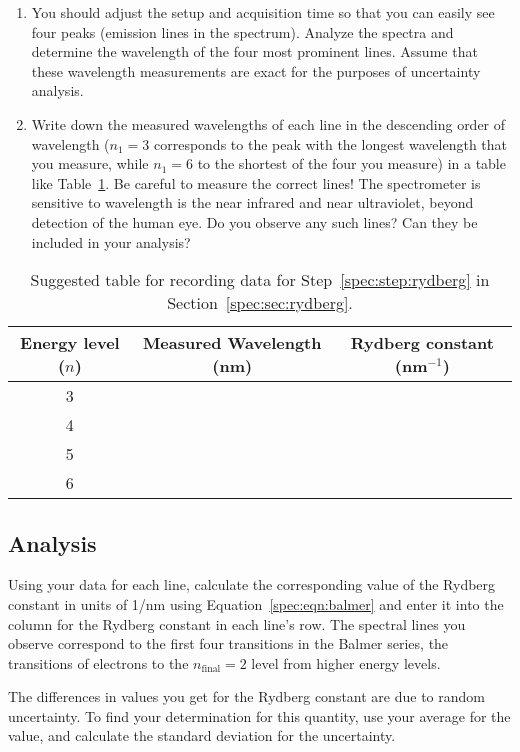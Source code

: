 \begin{enumerate}
	\item You should adjust the setup and acquisition time so that you can easily see four peaks
	(emission lines in the spectrum). Analyze the spectra and determine the wavelength of
	the four most prominent lines. Assume that these wavelength measurements are exact for the purposes of uncertainty analysis.
	
	\item\label{spec:step:rydberg} Write down the measured wavelengths of each line in the descending order of
	wavelength ($n_1 =3$ corresponds to the peak with the longest wavelength that you measure,
	while $n_1 = 6$ to the shortest of the four you measure) in a table like Table~\ref{spec:tab:rydberg}. Be careful to
	measure the correct lines! The spectrometer is sensitive to wavelength is the near infrared
	and near ultraviolet, beyond detection of the human eye. Do you observe any such lines?
	Can they be included in your analysis?
\end{enumerate}

\begin{table}
	\centering
	\begin{tabular}{c|c|c}
		\textbf{Energy level ($n$)} & \textbf{Measured Wavelength (nm)} & \textbf{Rydberg constant (nm$^{-1}$)} \\ \midrule
		3 & & \\ \midrule
		4 & & \\ \midrule
		5 & & \\ \midrule
		6 & & \\ \bottomrule
	\end{tabular}
	\caption{Suggested table for recording data for Step~\ref{spec:step:rydberg} in Section~\ref{spec:sec:rydberg}.}\label{spec:tab:rydberg}
\end{table}

\subsection{Analysis}

Using your data for each line, calculate the corresponding value of the
Rydberg constant in units of 1/nm using Equation~\ref{spec:eqn:balmer} and enter it into the column for the Rydberg constant
in each line's row. The spectral lines you observe correspond to the first four transitions
in the Balmer series, the transitions of electrons to the $n_\mathrm{final}=2$ level from higher energy
levels.

The differences in values you get for the Rydberg constant are due to random uncertainty. To find your determination for this quantity, use your average for the value, and calculate the standard deviation for the uncertainty.

